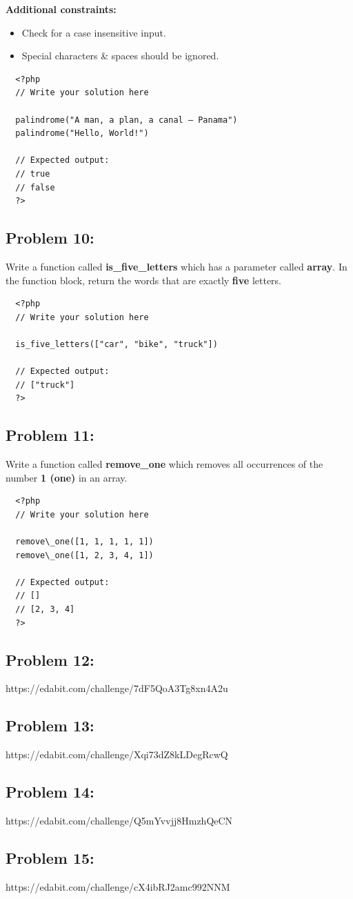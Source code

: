 \documentclass{article}
\begin{document}
\textbf{Additional constraints:}
\begin{itemize}
	\item Check for a case insensitive input.
  \item Special characters \& spaces should be ignored.
\end{itemize} 

\begin{verbatim}
  <?php  
  // Write your solution here

  palindrome("A man, a plan, a canal – Panama")
  palindrome("Hello, World!")

  // Expected output:
  // true
  // false
  ?>
\end{verbatim}

\subsection*{Problem 10:}
Write a function called \textbf{is\_five\_letters} which has a parameter called \textbf{array}. In the function block, return the words that are exactly \textbf{five} letters.

\begin{verbatim}
  <?php  
  // Write your solution here

  is_five_letters(["car", "bike", "truck"])

  // Expected output:
  // ["truck"]
  ?>
\end{verbatim}

\subsection*{Problem 11:}
Write a function called \textbf{remove\_one} which removes all occurrences of the number \textbf{1 (one)} in an array. 
\begin{verbatim}
  <?php  
  // Write your solution here

  remove\_one([1, 1, 1, 1, 1])
  remove\_one([1, 2, 3, 4, 1])

  // Expected output:
  // []
  // [2, 3, 4]
  ?>
\end{verbatim}

\subsection*{Problem 12:}

https://edabit.com/challenge/7dF5QoA3Tg8xn4A2u

\subsection*{Problem 13:}

https://edabit.com/challenge/Xqi73dZ8kLDegRcwQ

\subsection*{Problem 14:}

https://edabit.com/challenge/Q5mYvvjj8HmzhQeCN

\subsection*{Problem 15:}

https://edabit.com/challenge/cX4ibRJ2amc992NNM
\end{document}

